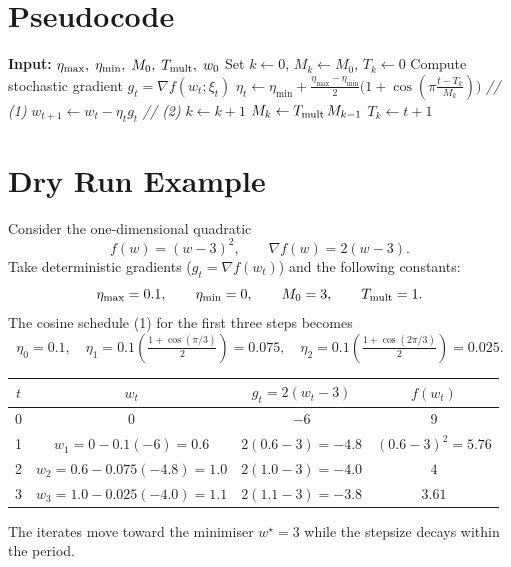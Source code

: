 \documentclass{article}
\begin{document}
\section*{Pseudocode}
\begin{algorithm}[H]
\caption{SGDR}
\begin{algorithmic}[1]
\STATE \textbf{Input:} $\eta_{\max},\;\eta_{\min},\;M_0,\;T_{\rm mult},\;w_0$
\STATE Set $k\leftarrow0$, $M_k\leftarrow M_0$, $T_k\leftarrow0$
    \STATE Compute stochastic gradient $g_t=\nabla f(w_t;\xi_t)$
    \STATE $\displaystyle\eta_t\leftarrow \eta_{\min}
          +\frac{\eta_{\max}-\eta_{\min}}{2}
            \bigl(1+\cos(\pi\frac{t-T_k}{M_k})\bigr)$ \hfill\textit{// (1)}
    \STATE $w_{t+1}\leftarrow w_t-\eta_t g_t$ \hfill\textit{// (2)}
        \STATE $k\leftarrow k+1$
        \STATE $M_k\leftarrow T_{\rm mult}\,M_{k-1}$
        \STATE $T_k\leftarrow t+1$ 
    \ENDIF
\ENDFOR
\end{algorithmic}
\end{algorithm}

\section*{Dry Run Example}
Consider the one‑dimensional quadratic
\[
f(w)=(w-3)^2,\qquad \nabla f(w)=2(w-3).
\]
Take deterministic gradients ($g_t=\nabla f(w_t)$) and the following
constants:
\[
\eta_{\max}=0.1,\qquad \eta_{\min}=0,\qquad M_0=3,\qquad T_{\rm mult}=1.
\]
The cosine schedule (1) for the first three steps becomes
\[
\eta_0=0.1,\quad
\eta_1=0.1\!\left(\tfrac{1+\cos(\pi/3)}{2}\right)=0.075,\quad
\eta_2=0.1\!\left(\tfrac{1+\cos(2\pi/3)}{2}\right)=0.025 .
\]

\begin{center}
\begin{tabular}{c|c|c|c}
$t$ & $w_t$ & $g_t=2(w_t-3)$ & $f(w_t)$ \\ \hline
0 & $0$ & $-6$ & $9$ \\
1 & $w_1=0-0.1(-6)=0.6$ & $2(0.6-3)=-4.8$ & $(0.6-3)^2=5.76$ \\
2 & $w_2=0.6-0.075(-4.8)=1.0$ & $2(1.0-3)=-4.0$ & $4$ \\
3 & $w_3=1.0-0.025(-4.0)=1.1$ & $2(1.1-3)=-3.8$ & $3.61$
\end{tabular}
\end{center}
The iterates move toward the minimiser $w^\star=3$ while the stepsize
decays within the period.
\end{document}

